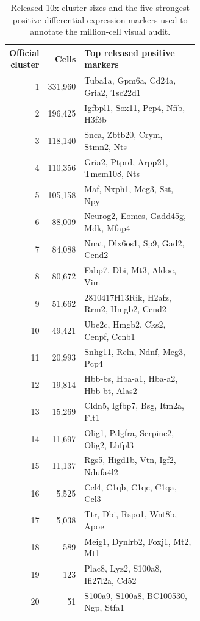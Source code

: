 \begin{longtable}{@{}rrp{0.62\linewidth}@{}}
\caption{Released 10x cluster sizes and the five strongest positive differential-expression markers used to annotate the million-cell visual audit.}\label{tab:revision3-tenx-markers}\\
\toprule
Official cluster & Cells & Top released positive markers \\
\midrule
\endhead
1 & 331,960 & Tuba1a, Gpm6a, Cd24a, Gria2, Tsc22d1 \\
2 & 196,425 & Igfbpl1, Sox11, Pcp4, Nfib, H3f3b \\
3 & 118,140 & Snca, Zbtb20, Crym, Stmn2, Nts \\
4 & 110,356 & Gria2, Ptprd, Arpp21, Tmem108, Nts \\
5 & 105,158 & Maf, Nxph1, Meg3, Sst, Npy \\
6 & 88,009 & Neurog2, Eomes, Gadd45g, Mdk, Mfap4 \\
7 & 84,088 & Nnat, Dlx6os1, Sp9, Gad2, Ccnd2 \\
8 & 80,672 & Fabp7, Dbi, Mt3, Aldoc, Vim \\
9 & 51,662 & 2810417H13Rik, H2afz, Rrm2, Hmgb2, Ccnd2 \\
10 & 49,421 & Ube2c, Hmgb2, Cks2, Cenpf, Ccnb1 \\
11 & 20,993 & Snhg11, Reln, Ndnf, Meg3, Pcp4 \\
12 & 19,814 & Hbb-bs, Hba-a1, Hba-a2, Hbb-bt, Alas2 \\
13 & 15,269 & Cldn5, Igfbp7, Bsg, Itm2a, Flt1 \\
14 & 11,697 & Olig1, Pdgfra, Serpine2, Olig2, Lhfpl3 \\
15 & 11,137 & Rgs5, Higd1b, Vtn, Igf2, Ndufa4l2 \\
16 & 5,525 & Ccl4, C1qb, C1qc, C1qa, Ccl3 \\
17 & 5,038 & Ttr, Dbi, Rspo1, Wnt8b, Apoe \\
18 & 589 & Meig1, Dynlrb2, Foxj1, Mt2, Mt1 \\
19 & 123 & Plac8, Lyz2, S100a8, Ifi27l2a, Cd52 \\
20 & 51 & S100a9, S100a8, BC100530, Ngp, Stfa1 \\
\bottomrule
\end{longtable}
